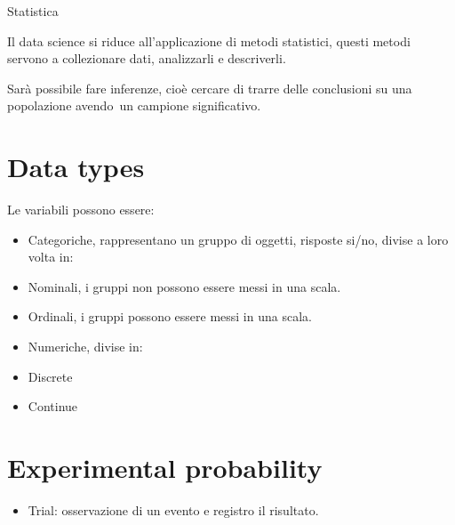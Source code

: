 \documentclass[
]{article}
\author{}
\date{}
\providecommand{\tightlist}{%
  \setlength{\itemsep}{0pt}\setlength{\parskip}{0pt}}
\begin{document}
{}

{Statistica}

{Il data science si riduce all'applicazione di metodi statistici, questi
metodi servono a collezionare dati, analizzarli e }{descriverli.}

{Sarà possibile fare inferenze, cioè cercare di trarre delle conclusioni
su una popolazione }{avendo}{~un campione significativo.}

{}

\section{\texorpdfstring{{Data
types}}{Data types}}\label{h.41pjl3u7385g}

{Le variabili possono essere:}

\begin{itemize}
\tightlist
\item
  {Categoriche, rappresentano un gruppo di oggetti, risposte si/no,
  divise a loro volta in:}
\end{itemize}

\begin{itemize}
\tightlist
\item
  {Nominali, i gruppi non possono essere messi in una scala.}
\item
  {Ordinali, i gruppi possono essere messi in una scala.}
\end{itemize}

\begin{itemize}
\tightlist
\item
  {Numeriche, divise in:}
\end{itemize}

\begin{itemize}
\tightlist
\item
  {Discrete}
\item
  {Continue}
\end{itemize}

{}

\section{\texorpdfstring{{Experimental
probability}}{Experimental probability}}\label{h.gft5n92ulwu4}

\begin{itemize}
\tightlist
\item
  {Trial}{: osservazione di un evento e registro il risultato.}
\end{itemize}
\end{document}
